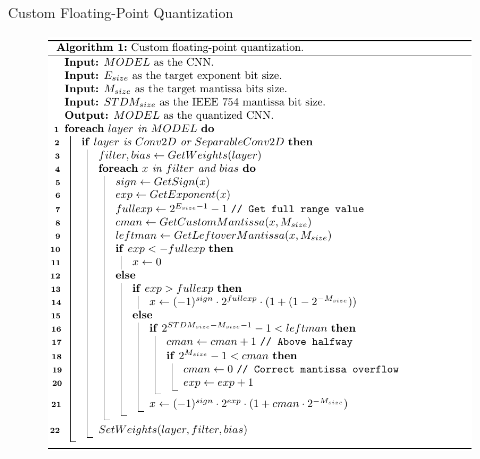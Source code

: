 \begin{frame}{Custom Floating-Point Quantization}
	\begin{figure}
		\centering
		\includegraphics[width=0.6\columnwidth]{slides/algorithm_fp_2.pdf}
	\end{figure}
		
\end{frame}



